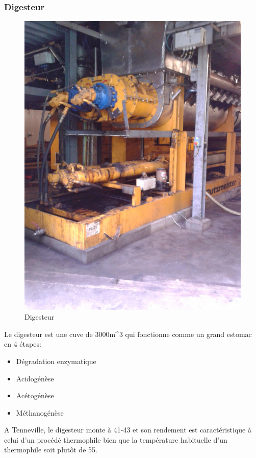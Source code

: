\subsubsection{Digesteur}
\begin{figure}
  \centering
  \includegraphics[scale=0.07]{task7/tenneville/IMG_20141105_112953.jpg}
  \caption{Digesteur}
  \label{fig:digesteur}
\end{figure}
Le digesteur est une cuve de \unit{3000}{m^3} qui fonctionne comme un grand estomac en 4 étapes: 
\begin{itemize}
\item Dégradation enzymatique
\item Acidogénèse
\item Acétogénèse
\item Méthanogénèse
\end{itemize}
A Tenneville, le digesteur monte à \unit{41}{\celsius}-\unit{43}{\celsius}  et son rendement est caractéristique à celui d'un procédé thermophile bien que la température habituelle d'un thermophile soit plutôt de \unit{55}{\celsius}. 

